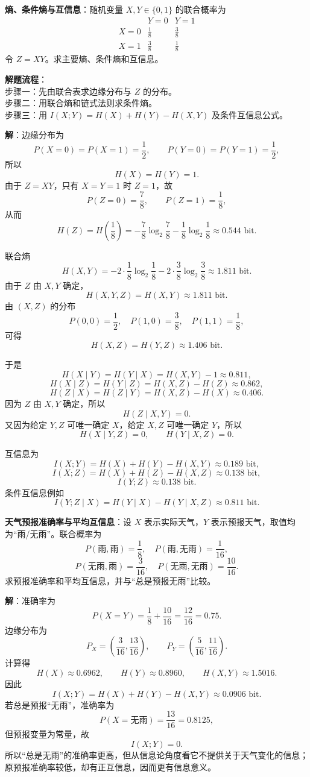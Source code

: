 \begin{example}
\label{hw:ch2-entropy-conditional-mutual-information}
\textbf{熵、条件熵与互信息}：随机变量 $X,Y\in\{0,1\}$ 的联合概率为
\[
\begin{array}{c|cc}
 & Y=0 & Y=1\\
\hline
X=0 & \frac18 & \frac38\\
X=1 & \frac38 & \frac18
\end{array}
\]
令 $Z=XY$。求主要熵、条件熵和互信息。

\noindent \textbf{解题流程}：\\[2pt]
步骤一：先由联合表求边缘分布与 $Z$ 的分布。\\
步骤二：用联合熵和链式法则求条件熵。\\
步骤三：用 $I(X;Y)=H(X)+H(Y)-H(X,Y)$ 及条件互信息公式。

\textbf{解}：边缘分布为
\[
P(X=0)=P(X=1)=\frac12,
\qquad
P(Y=0)=P(Y=1)=\frac12,
\]
所以
\[
H(X)=H(Y)=1.
\]
由于 $Z=XY$，只有 $X=Y=1$ 时 $Z=1$，故
\[
P(Z=0)=\frac78,
\qquad
P(Z=1)=\frac18,
\]
从而
\[
H(Z)=H\left(\frac18\right)
=-\frac78\log_2\frac78-\frac18\log_2\frac18
\approx0.544\text{ bit}.
\]

联合熵
\[
H(X,Y)=-2\cdot\frac18\log_2\frac18-2\cdot\frac38\log_2\frac38
\approx1.811\text{ bit}.
\]
由于 $Z$ 由 $X,Y$ 确定，
\[
H(X,Y,Z)=H(X,Y)\approx1.811\text{ bit}.
\]
由 $(X,Z)$ 的分布
\[
P(0,0)=\frac12,
\quad P(1,0)=\frac38,
\quad P(1,1)=\frac18,
\]
可得
\[
H(X,Z)=H(Y,Z)\approx1.406\text{ bit}.
\]

于是
\[
H(X\mid Y)=H(Y\mid X)=H(X,Y)-1\approx0.811,
\]
\[
H(X\mid Z)=H(Y\mid Z)=H(X,Z)-H(Z)\approx0.862,
\]
\[
H(Z\mid X)=H(Z\mid Y)=H(X,Z)-H(X)\approx0.406.
\]
因为 $Z$ 由 $X,Y$ 确定，所以
\[
H(Z\mid X,Y)=0.
\]
又因为给定 $Y,Z$ 可唯一确定 $X$，给定 $X,Z$ 可唯一确定 $Y$，所以
\[
H(X\mid Y,Z)=0,
\qquad
H(Y\mid X,Z)=0.
\]

互信息为
\[
I(X;Y)=H(X)+H(Y)-H(X,Y)
\approx0.189\text{ bit},
\]
\[
I(X;Z)=H(X)+H(Z)-H(X,Z)
\approx0.138\text{ bit},
\]
\[
I(Y;Z)\approx0.138\text{ bit}.
\]
条件互信息例如
\[
I(Y;Z\mid X)=H(Y\mid X)-H(Y\mid X,Z)
\approx0.811\text{ bit}.
\]
\end{example}

\begin{example}
\label{hw:ch2-weather-mutual-information}
\textbf{天气预报准确率与平均互信息}：设 $X$ 表示实际天气，$Y$ 表示预报天气，取值均为“雨/无雨”。联合概率为
\[
P(\text{雨},\text{雨})=\frac18,
\quad
P(\text{雨},\text{无雨})=\frac1{16},
\]
\[
P(\text{无雨},\text{雨})=\frac3{16},
\quad
P(\text{无雨},\text{无雨})=\frac{10}{16}.
\]
求预报准确率和平均互信息，并与“总是预报无雨”比较。

\textbf{解}：准确率为
\[
P(X=Y)=\frac18+\frac{10}{16}=\frac{12}{16}=0.75.
\]
边缘分布为
\[
P_X=\left(\frac3{16},\frac{13}{16}\right),
\qquad
P_Y=\left(\frac5{16},\frac{11}{16}\right).
\]
计算得
\[
H(X)\approx0.6962,
\qquad
H(Y)\approx0.8960,
\qquad
H(X,Y)\approx1.5016.
\]
因此
\[
I(X;Y)=H(X)+H(Y)-H(X,Y)
\approx0.0906\text{ bit}.
\]
若总是预报“无雨”，准确率为
\[
P(X=\text{无雨})=\frac{13}{16}=0.8125,
\]
但预报变量为常量，故
\[
I(X;Y)=0.
\]
所以“总是无雨”的准确率更高，但从信息论角度看它不提供关于天气变化的信息；原预报准确率较低，却有正互信息，因而更有信息意义。
\end{example}

